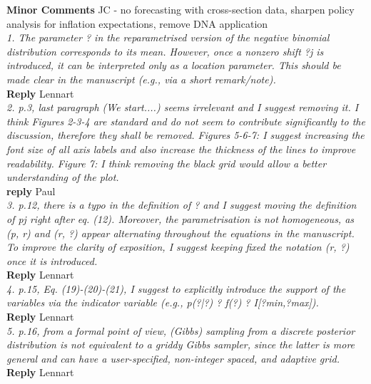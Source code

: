 \documentclass[12pt]{article}
\begin{document}
\textbf{Minor Comments} JC - no forecasting with cross-section data, sharpen policy analysis for inflation expectations, remove DNA application\\

\textit{1. The parameter ? in the reparametrised version of the negative binomial distribution corresponds to its mean. However, once a nonzero shift ?j is introduced, it can be interpreted
only as a location parameter. This should be made clear in the manuscript (e.g., via a short
remark/note).}\\

\textbf{Reply} Lennart\\

\textit{2. p.3, last paragraph (We start....) seems irrelevant and I suggest removing it. I think Figures 2-3-4 are standard and do not seem to contribute significantly to the discussion, therefore they shall be removed. Figures 5-6-7: I suggest increasing the font size of all axis labels and also increase the thickness of the lines to improve readability. Figure 7: I think removing the black grid would allow a better understanding of the plot.}\\

\textbf{reply} Paul\\

\textit{3. p.12, there is a typo in the definition of ? and I suggest moving the definition of pj right after eq. (12). Moreover, the parametrisation is not homogeneous, as (p, r) and (r, ?) appear alternating throughout the equations in the manuscript. To improve the clarity of exposition, I suggest keeping fixed the notation (r, ?) once it is introduced.}\\

\textbf{Reply} Lennart\\

\textit{4. p.15, Eq. (19)-(20)-(21), I suggest to explicitly introduce the support of the variables via the indicator variable (e.g., p(?|?) ? f(?) ? I[?min,?max]).}\\

\textbf{Reply} Lennart\\

\textit{5. p.16, from a formal point of view, (Gibbs) sampling from a discrete posterior distribution is not equivalent to a griddy Gibbs sampler, since the latter is more general and can have a user-specified, non-integer spaced, and adaptive grid.}\\

\textbf{Reply} Lennart\\
\end{document}
